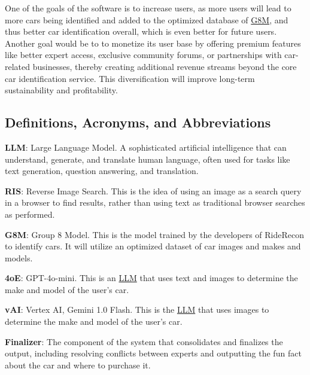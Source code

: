 \documentclass[]{article}
\begin{document}
One of the goals of the software is to increase users, as more users will lead to more cars being identified and added to the optimized database of \underline{G8M}, and thus better car identification overall, which is even better for future users. Another goal would be to to monetize its user base by offering premium features like better expert access, exclusive community forums, or partnerships with car-related businesses, thereby creating additional revenue streams beyond the core car identification service. This diversification will improve long-term sustainability and profitability.


\subsection{Definitions, Acronyms, and Abbreviations}
\label{sub:definitions_acronyms_and_abbreviations}
\textbf{LLM}: Large Language Model. A sophisticated artificial intelligence that can understand, generate, and translate human language, often used for tasks like text generation, question answering, and translation.

\textbf{RIS}: Reverse Image Search. This is the idea of using an image as a search query in a browser to find results, rather than using text as traditional browser searches as performed.

\textbf{G8M}: Group 8 Model. This is the model trained by the developers of RideRecon to identify cars. It will utilize an optimized dataset of car images and makes and models.

\textbf{4oE}: GPT-4o-mini. This is an \underline{LLM} that uses text and images to determine the make and model of the user's car.

\textbf{vAI}: Vertex AI, Gemini 1.0 Flash. This is the \underline{LLM} that uses images to determine the make and model of the user's car.

\textbf{Finalizer}: The component of the system that consolidates and finalizes the output, including resolving conflicts between experts and outputting the fun fact about the car and where to purchase it.
\end{document}
